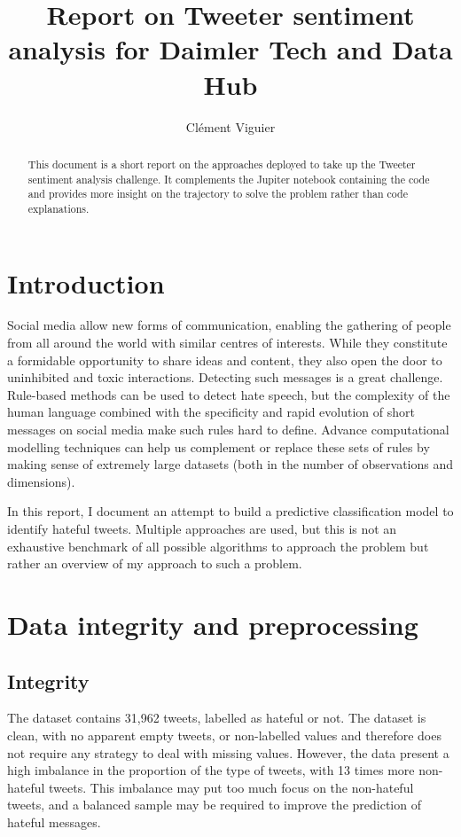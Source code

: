 \documentclass[a4paper]{tufte-handout}
\title{Report on Tweeter sentiment analysis for Daimler Tech and Data Hub}
\author{Clément Viguier}
\begin{document}
\maketitle%

\begin{fullwidth}
\begin{abstract}
\noindent
This document is a short report on the approaches deployed to take up the Tweeter sentiment analysis challenge. It complements the Jupiter notebook containing the code and provides more insight on the trajectory to solve the problem rather than code explanations.
\end{abstract}

\section{Introduction}
Social media allow new forms of communication, enabling the gathering of people from all around the world with similar centres of interests. While they constitute a formidable opportunity to share ideas and content, they also open the door to uninhibited and toxic interactions. Detecting such messages is a great challenge. Rule-based methods can be used to detect hate speech, but the complexity of the human language combined with the specificity and rapid evolution of short messages on social media make such rules hard to define. Advance computational modelling techniques can help us complement or replace these sets of rules by making sense of extremely large datasets (both in the number of observations and dimensions).

In this report, I document an attempt to build a predictive classification model to identify hateful tweets. Multiple approaches are used, but this is not an exhaustive benchmark of all possible algorithms to approach the problem but rather an overview of my approach to such a problem.

\section{Data integrity and preprocessing}

\subsection{Integrity}

The dataset contains 31,962 tweets, labelled as hateful or not. The dataset is clean, with no apparent empty tweets, or non-labelled values and therefore does not require any strategy to deal with missing values.
However, the data present a high imbalance in the proportion of the type of tweets, with 13 times more non-hateful tweets. This imbalance may put too much focus on the non-hateful tweets, and a balanced sample may be required to improve the prediction of hateful messages.


\end{fullwidth}
\end{document}
